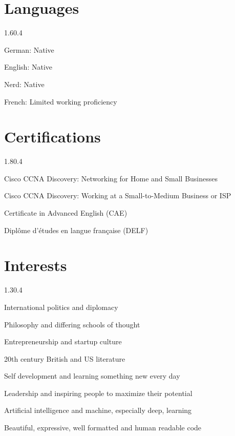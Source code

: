 \section{Languages}{1.6}{0.4}
\begin{simpleentry}
  \item German: Native
  \item English: Native
  \item Nerd: Native
  \item French: Limited working proficiency
\end{simpleentry}

\section{Certifications}{1.8}{0.4}
\begin{simpleentry}
  \item Cisco CCNA Discovery: Networking for Home and Small Businesses
  \item Cisco CCNA Discovery: Working at a Small-to-Medium Business or ISP
  \item Certificate in Advanced English (CAE)
  \item Diplôme d'études en langue française (DELF)
\end{simpleentry}

\section{Interests}{1.3}{0.4}
\begin{simpleentry}
  \item International politics and diplomacy
  \item Philosophy and differing schools of thought
  \item Entrepreneurship and startup culture
  \item 20th century British and US literature
  \item Self development and learning something new every day
  \item Leadership and inspiring people to maximize their potential
  \item Artificial intelligence and machine, especially deep, learning
  \item Beautiful, expressive, well formatted and human readable code
\end{simpleentry}

%


